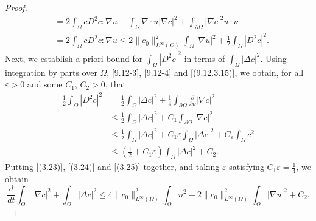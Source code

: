 \documentclass[10pt,a4paper]{amsart}
\numberwithin{equation}{section}
\begin{document}
\begin{proof}
\begin{equation}
\begin{aligned}
&= 2 \int_\Omega c D^2 c : \nabla u -\int_\Omega \nabla\cdot u |\nabla c|^2 
 +\int_{\partial\Omega} |\nabla c|^2 u\cdot \nu \\
&= 2 \int_\Omega c D^2 c : \nabla u \leq 2\|c_0\|_{L^\infty(\Omega)}^2 
 \int_\Omega |\nabla u|^2 + \frac{1}{2} \int_\Omega |D^2 c|^2.
\end{aligned}
\end{equation}
Next, we establish a priori bound for $\int_\Omega |D^2 c|^2$ in terms of 
$\int_\Omega |\Delta c|^2$. Using integration by parts over
$\Omega$, \eqref{9.12-3}, \eqref{9.12-4} and \eqref{(9.12.3.15)}, we obtain, 
for all $\varepsilon>0$ and some $C_1$, $C_2>0$, that
\begin{equation}\label{(3.25)}
\begin{aligned}
\frac{1}{2} \int_\Omega |D^2 c|^2
&= \frac{1}{2} \int_\Omega |\Delta c|^2 
 + \frac{1}{4} \int_{\partial\Omega} \frac{\partial}{\partial \nu} |\nabla c|^2 \\
&\leq \frac{1}{2} \int_\Omega |\Delta c|^2 + C_1 \int_{\partial\Omega} |\nabla c|^2 \\
&\leq \frac{1}{2} \int_\Omega |\Delta c|^2 + C_1 \varepsilon \int_\Omega |\Delta c|^2 + C_\varepsilon \int_\Omega c^2\\
&\leq ( \frac{1}{2}+ C_1 \varepsilon ) \int_\Omega |\Delta c|^2 + C_2.
\end{aligned}
\end{equation}
Putting \eqref{(3.23)}, \eqref{(3.24)} and \eqref{(3.25)} together, and taking 
$\varepsilon$ satisfying $ C_1 \varepsilon = \frac{1}{4}$, we obtain
\begin{equation}\label{(3.26)}
\frac{d}{dt} \int_\Omega |\nabla c|^2 + \int_\Omega |\Delta c|^2
\leq 4\|c_0\|_{L^\infty(\Omega)}^2  \int_\Omega n^2 + 2 \|c_0\|_{L^\infty(\Omega)}^2  \int_\Omega |\nabla u|^2 + C_2.
\end{equation}


\end{proof}
\end{document}
